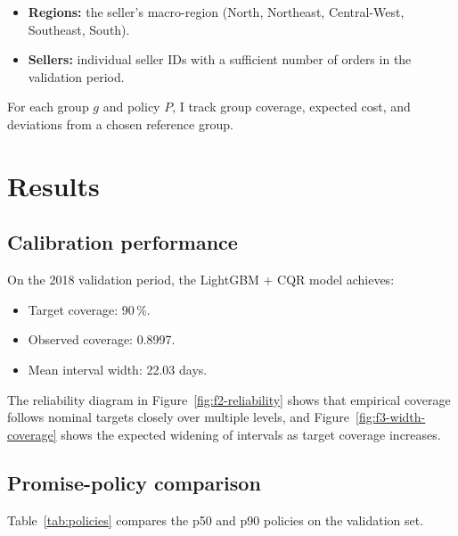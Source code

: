 \documentclass[12pt]{article}
\begin{document}
\begin{itemize}
  \item \textbf{Regions:} the seller’s macro-region (North, Northeast, Central-West, Southeast, South).
  \item \textbf{Sellers:} individual seller IDs with a sufficient number of orders in the validation period.
\end{itemize}

For each group $g$ and policy $P$, I track group coverage, expected cost, and deviations from a chosen reference group.

\section{Results}

\subsection{Calibration performance}
On the 2018 validation period, the LightGBM + CQR model achieves:
\begin{itemize}
  \item Target coverage: 90\,\%.
  \item Observed coverage: 0.8997.
  \item Mean interval width: 22.03 days.
\end{itemize}

The reliability diagram in Figure~\ref{fig:f2-reliability} shows that empirical coverage follows nominal targets closely over multiple levels, and Figure~\ref{fig:f3-width-coverage} shows the expected widening of intervals as target coverage increases.

\subsection{Promise-policy comparison}
Table~\ref{tab:policies} compares the p50 and p90 policies on the validation set.

\begin{table}[t]
  \centering
  \caption{Policy metrics for two quantile-based promise policies on the Olist validation set. The cost uses $\lambda_{\text{late}}=5$ and $\lambda_{\text{early}}=1$.}
  \label{tab:policies}
  \setlength{\tabcolsep}{4pt}
  \renewcommand{\arraystretch}{1.1}
\end{table}
\end{document}
